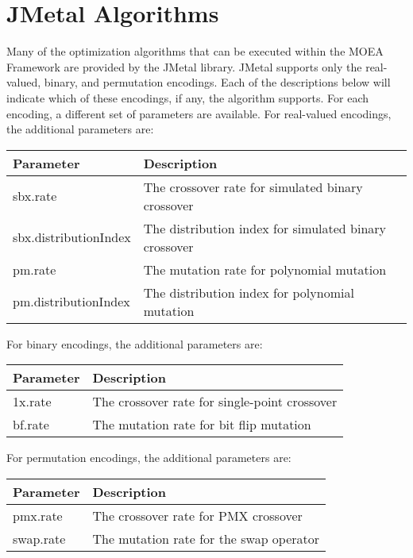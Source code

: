 \section{JMetal Algorithms}
Many of the optimization algorithms that can be executed within the MOEA Framework are provided by the JMetal library.  JMetal supports only the real-valued, binary, and permutation encodings.  Each of the descriptions below will indicate which of these encodings, if any, the algorithm supports.  For each encoding, a different set of parameters are available.  For real-valued encodings, the additional parameters are:
\newline
\newline
\begin{tabularx}{\linewidth}{lX}
  \hline
  Parameter & Description \\
  \hline
  sbx.rate & The crossover rate for simulated binary crossover \\
  sbx.distributionIndex & The distribution index for simulated binary crossover \\
  pm.rate & The mutation rate for polynomial mutation \\
  pm.distributionIndex & The distribution index for polynomial mutation \\
  \hline
\end{tabularx}
\newline
\newline
For binary encodings, the additional parameters are:
\newline
\newline
\begin{tabularx}{\linewidth}{lX}
  \hline
  Parameter & Description \\
  \hline
  1x.rate & The crossover rate for single-point crossover \\
  bf.rate & The mutation rate for bit flip mutation \\
  \hline
\end{tabularx}
\newline
\newline
For permutation encodings, the additional parameters are:
\newline
\newline
\begin{tabularx}{\linewidth}{lX}
  \hline
  Parameter & Description \\
  \hline
  pmx.rate & The crossover rate for PMX crossover \\
  swap.rate & The mutation rate for the swap operator \\
  \hline
\end{tabularx}

